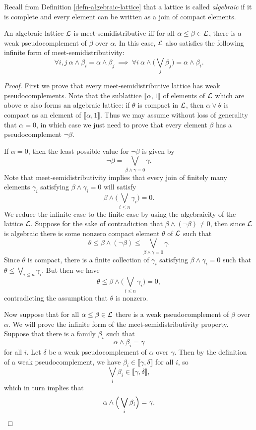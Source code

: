 \begin{appendices}
Recall from Definition \ref{defn-algebraic-lattice} that a lattice is called \emph{algebraic} if it is complete and every element can be written as a join of compact elements.

\begin{prop}\label{prop-infinite-semidistributive-algebraic} An algebraic lattice $\mathcal{L}$ is meet-semidistributive iff for all $\alpha \le \beta \in \mathcal{L}$, there is a weak pseudocomplement of $\beta$ over $\alpha$. In this case, $\mathcal{L}$ also satisfies the following infinite form of meet-semidistributivity:
\[
\forall i,j\  \alpha \wedge \beta_i = \alpha \wedge \beta_j \ \implies\ \forall i\ \alpha \wedge \Big(\bigvee_j \beta_j\Big) = \alpha \wedge \beta_i.\label{infinite-meet-semidistributive-law}\tag{SD$_\infty$($\wedge$)}
\]
\end{prop}
\begin{proof} First we prove that every meet-semidistributive lattice has weak pseudocomplements. Note that the sublattice $\llbracket \alpha, 1 \rrbracket$ of elements of $\mathcal{L}$ which are above $\alpha$ also forms an algebraic lattice: if $\theta$ is compact in $\mathcal{L}$, then $\alpha \vee \theta$ is compact as an element of $\llbracket \alpha, 1 \rrbracket$. Thus we may assume without loss of generality that $\alpha = 0$, in which case we just need to prove that every element $\beta$ has a pseudocomplement $\neg \beta$.

If $\alpha = 0$, then the least possible value for $\neg \beta$ is given by
\[
\neg \beta = \bigvee_{\beta \wedge \gamma = 0} \gamma.
\]
Note that meet-semidistributivity implies that every join of finitely many elements $\gamma_i$ satisfying $\beta \wedge \gamma_i = 0$ will satisfy
\[
\beta \wedge \Big(\bigvee_{i \le n} \gamma_i\Big) = 0.
\]
We reduce the infinite case to the finite case by using the algebraicity of the lattice $\mathcal{L}$. Suppose for the sake of contradiction that $\beta \wedge (\neg \beta) \ne 0$, then since $\mathcal{L}$ is algebraic there is some nonzero compact element $\theta$ of $\mathcal{L}$ such that
\[
\theta \le \beta \wedge (\neg \beta) \le \bigvee_{\beta \wedge \gamma = 0} \gamma.
\]
Since $\theta$ is compact, there is a finite collection of $\gamma_i$ satisfying $\beta \wedge \gamma_i = 0$ such that $\theta \le \bigvee_{i \le n} \gamma_i$. But then we have
\[
\theta \le \beta \wedge \Big(\bigvee_{i \le n} \gamma_i\Big) = 0,
\]
contradicting the assumption that $\theta$ is nonzero.

Now suppose that for all $\alpha \le \beta \in \mathcal{L}$ there is a weak pseudocomplement of $\beta$ over $\alpha$. We will prove the infinite form of the meet-semidistributivity property. Suppose that there is a family $\beta_i$ such that
\[
\alpha \wedge \beta_i = \gamma
\]
for all $i$. Let $\delta$ be a weak pseudocomplement of $\alpha$ over $\gamma$. Then by the definition of a weak pseudocomplement, we have $\beta_i \in \llbracket \gamma, \delta \rrbracket$ for all $i$, so
\[
\bigvee_i \beta_i \in \llbracket \gamma, \delta \rrbracket,
\]
which in turn implies that
\[
\alpha \wedge \Big(\bigvee_i \beta_i\Big) = \gamma.\qedhere
\]
\end{proof}


\end{appendices}
